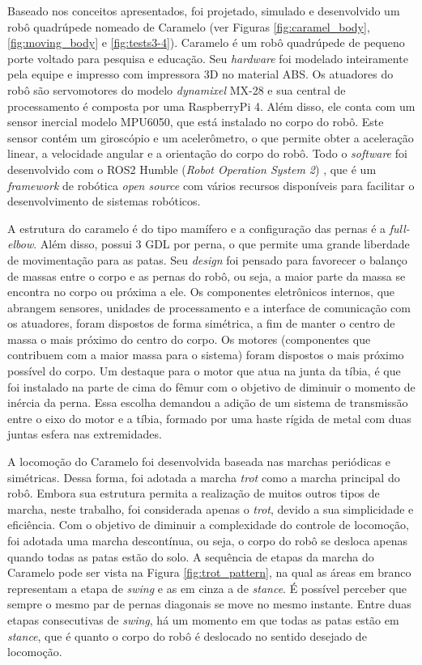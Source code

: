 \documentclass[../main.tex]{subfiles}
\begin{document}
Baseado nos conceitos apresentados, foi projetado, simulado e desenvolvido um robô quadrúpede nomeado de Caramelo (ver Figuras \ref{fig:caramel_body}, \ref{fig:moving_body} e \ref{fig:tests3-4}). Caramelo é um robô quadrúpede de pequeno porte voltado para pesquisa e educação. Seu \textit{hardware} foi modelado inteiramente pela equipe e impresso com impressora 3D no material ABS. Os atuadores do robô são servomotores do modelo \textit{dynamixel} MX-28 e sua central de processamento é composta por uma RaspberryPi 4. Além disso, ele conta com um sensor inercial modelo MPU6050, que está instalado no corpo do robô. Este sensor contém um giroscópio e um acelerômetro, o que permite obter a aceleração linear, a velocidade angular e a orientação do corpo do robô. Todo o \textit{software} foi desenvolvido com o ROS2 Humble (\textit{Robot Operation System 2}) \cite{ROS2Humble}, que é um \textit{framework} de robótica \textit{open source} com vários recursos disponíveis para facilitar o desenvolvimento de sistemas robóticos.

A estrutura do caramelo é do tipo mamífero e a configuração das pernas é a \textit{full-elbow}. Além disso, possui 3 GDL por perna, o que permite uma grande liberdade de movimentação para as patas. Seu \textit{design} foi pensado para favorecer o balanço de massas entre o corpo e as pernas do robô, ou seja, a maior parte da massa se encontra no corpo ou próxima a ele. Os componentes eletrônicos internos, que abrangem sensores, unidades de processamento e a interface de comunicação com os atuadores, foram dispostos de forma simétrica, a fim de manter o centro de massa o mais próximo do centro do corpo. Os motores (componentes que contribuem com a maior massa para o sistema) foram dispostos o mais próximo possível do corpo. Um destaque para o motor que atua na junta da tíbia, é que foi instalado na parte de cima do fêmur com o objetivo de diminuir o momento de inércia da perna. Essa escolha demandou a adição de um sistema de transmissão entre o eixo do motor e a tíbia, formado por uma haste rígida de metal com duas juntas esfera nas extremidades.

A locomoção do Caramelo foi desenvolvida baseada nas marchas periódicas e simétricas. Dessa forma, foi adotada a marcha \textit{trot} como a marcha principal do robô. Embora sua estrutura permita a realização de muitos outros tipos de marcha, neste trabalho, foi considerada apenas o \textit{trot}, devido a sua simplicidade e eficiência. Com o objetivo de diminuir a complexidade do controle de locomoção, foi adotada uma marcha descontínua, ou seja, o corpo do robô se desloca apenas quando todas as patas estão do solo. A sequência de etapas da marcha do Caramelo pode ser vista na Figura \ref{fig:trot_pattern}, na qual as áreas em branco representam a etapa de \textit{swing} e as em cinza a de \textit{stance}. É possível perceber que sempre o mesmo par de pernas diagonais se move no mesmo instante. Entre duas etapas consecutivas de \textit{swing}, há um momento em que todas as patas estão em \textit{stance}, que é quanto o corpo do robô é deslocado no sentido desejado de locomoção.
\end{document}

